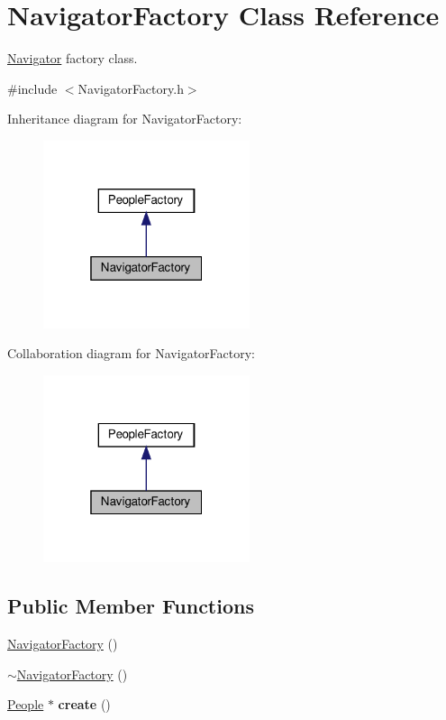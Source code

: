 \hypertarget{classNavigatorFactory}{}\section{Navigator\+Factory Class Reference}
\label{classNavigatorFactory}


\hyperlink{classNavigator}{Navigator} factory class.  




{\ttfamily \#include $<$Navigator\+Factory.\+h$>$}



Inheritance diagram for Navigator\+Factory\+:\nopagebreak
\begin{figure}[H]
\begin{center}
\leavevmode
\includegraphics[width=172pt]{classNavigatorFactory__inherit__graph}
\end{center}
\end{figure}


Collaboration diagram for Navigator\+Factory\+:\nopagebreak
\begin{figure}[H]
\begin{center}
\leavevmode
\includegraphics[width=172pt]{classNavigatorFactory__coll__graph}
\end{center}
\end{figure}
\subsection*{Public Member Functions}
\begin{DoxyCompactItemize}
\item 
\hyperlink{classNavigatorFactory_a6dffc936447428b43de6432c3684f43e}{Navigator\+Factory} ()
\item 
\hyperlink{classNavigatorFactory_a761b19635335f0d772196005e443ebd3}{$\sim$\+Navigator\+Factory} ()
\item 
\mbox{\label{classNavigatorFactory_ae4db06a5f2ee294e6e540b8922d55313}} 
\hyperlink{classPeople}{People} $\ast$ {\bfseries create} ()
\end{DoxyCompactItemize}


